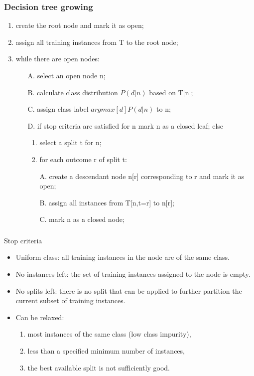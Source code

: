 \documentclass{beamer}
\begin{document}
\begin{frame}
\frametitle{Decision tree growing}
\begin{block}{}
\begin{enumerate}
\item create the root node and mark it as open;
\item assign all training instances from T to the root node;
\item while there are open nodes:
\begin{itemize}
\item[A.] select an open node n;
\item[B.] calculate class distribution $P(d|n)$ based on T[n];
\item[C.] assign class label $argmax[d]P(d|n)$ to n;
\item[D.] if stop criteria are satisfied for n mark n as a closed leaf; else
\begin{enumerate}
\item select a split t for n; 
\item for each outcome r of split t:
\item[A.] create a descendant node n[r] corresponding to r and mark it as open;
\item[B.] assign all instances from T[n,t=r] to n[r];
\item[C.] mark n as a closed node;
\end{enumerate}
\end{itemize}
\end{enumerate}
\end{block}
\end{frame}

\begin{frame}
\frametitle{}
\begin{block}{Stop criteria}
\begin{itemize}
\item Uniform class: all training instances in the node are of the same class.
\item No instances left: the set of training instances assigned to the node is empty.
\item No splits left: there is no split that can be applied to further partition the current subset of training instances.
\item Can be relaxed:
\begin{enumerate}
\item most instances of the same class (low class impurity),
\item less than a specified minimum number of instances,
\item the best available split is not sufficiently good.
\end{enumerate}
\end{itemize}
\end{block}
\end{frame}
\end{document}
